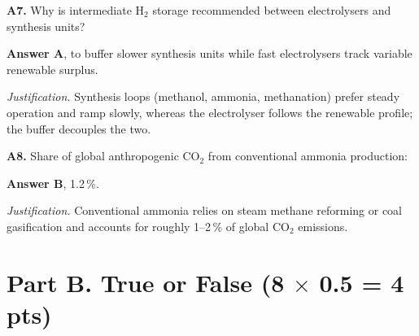 \documentclass[11pt,a4paper]{article}
\newcommand{\q}[2]{\par\medskip\textbf{#1.} #2\par}
\newcommand{\answer}[2]{\textcolor{ans}{\textbf{Answer #1}}, #2\par}
\newcommand{\why}[1]{\textit{Justification.} #1\par}
\newcommand{\pts}[1]{\hfill{\normalsize\textbf{(#1)}}}
\begin{document}
\q{A7}{Why is intermediate H$_2$ storage recommended between electrolysers and synthesis units?}
\answer{A}{to buffer slower synthesis units while fast electrolysers track variable renewable surplus.}
\why{Synthesis loops (methanol, ammonia, methanation) prefer steady operation and ramp slowly, whereas the
electrolyser follows the renewable profile; the buffer decouples the two.}

\q{A8}{Share of global anthropogenic CO$_2$ from conventional ammonia production:}
\answer{B}{1.2\,\%.}
\why{Conventional ammonia relies on steam methane reforming or coal gasification and accounts for roughly 1--2\,\%
of global CO$_2$ emissions.}

\section{Part B. True or False \pts{8 $\times$ 0.5 = 4 pts}}
\end{document}
